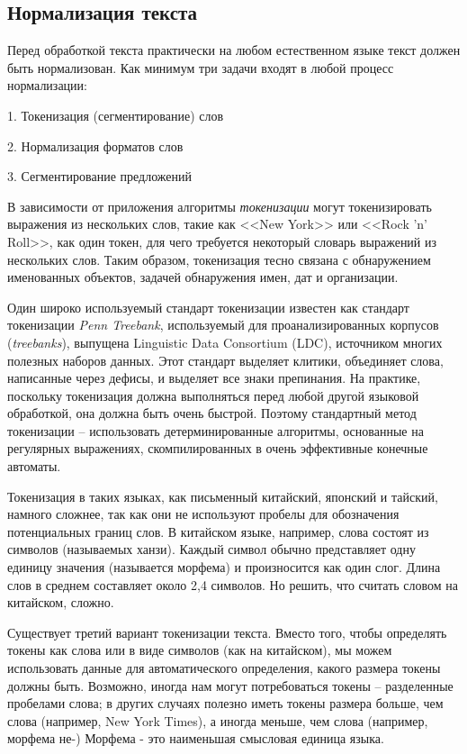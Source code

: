 \documentclass[a4paper,12pt,preview]{report} %
\begin{document}
	
	\subsection{Нормализация текста}
	
	Перед обработкой текста практически на любом естественном языке текст должен быть нормализован. Как минимум три задачи входят в любой процесс нормализации:
	
	1. Токенизация (сегментирование) слов
	
	2. Нормализация форматов слов
	
	3. Сегментирование предложений
	 
	В зависимости от приложения алгоритмы \textit{токенизации} могут токенизировать выражения из нескольких слов, такие как <<New York>> или <<Rock 'n' Roll>>, как один токен, для чего требуется некоторый словарь выражений из нескольких слов. Таким образом, токенизация тесно связана с обнаружением именованных объектов, задачей обнаружения имен, дат и	организации.
	
	Один широко используемый стандарт токенизации известен как стандарт токенизации \textit{Penn Treebank}, используемый для проанализированных корпусов (\textit{treebanks}), выпущена Linguistic Data Consortium (LDC), источником многих полезных наборов данных. Этот стандарт выделяет клитики, объединяет слова, написанные через дефисы, и выделяет все знаки препинания.
	На практике, поскольку токенизация должна выполняться перед любой другой языковой обработкой, она должна быть очень быстрой. Поэтому стандартный метод токенизации --
	использовать детерминированные алгоритмы, основанные на регулярных выражениях, скомпилированных в очень эффективные конечные автоматы.
	
	Токенизация в таких языках, как письменный китайский, японский и тайский, намного сложнее, так как они не используют пробелы для обозначения потенциальных границ слов.
	В китайском языке, например, слова состоят из символов (называемых ханзи). Каждый символ обычно представляет одну единицу значения (называется
	морфема) и произносится как один слог. Длина слов в среднем составляет около 2,4 символов. Но решить, что считать словом на китайском, сложно.
	
	
	Существует третий вариант токенизации текста. Вместо того, чтобы определять токены как слова
	или в виде символов (как на китайском), мы можем использовать данные для автоматического определения, какого размера токены должны быть. Возможно, иногда нам могут потребоваться токены -- разделенные пробелами
	слова; в других случаях полезно иметь токены размера больше, чем слова (например, New York Times), а иногда меньше, чем слова (например, морфема не-) Морфема - это наименьшая смысловая единица языка.
	
\end{document}
